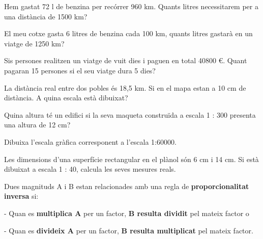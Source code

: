 \begin{mylist}
\exer
  Hem gastat 72 l de benzina per recórrer 960 km. Quants litres
  necessitarem per a una distància de 1500 km?
  
  
  
\exer
  El meu cotxe gasta 6 litres de benzina cada 100 km, quants litres
  gastarà en un viatge de 1250 km?


\exer
  Sis persones realitzen un viatge de vuit dies i paguen en total 40800
  \euro{}. Quant pagaran 15 persones si el seu viatge dura 5 dies?


\exer
  La distància real entre dos pobles és 18,5 km. Si en el mapa estan a
  10 cm de distància. A quina escala està dibuixat?


\exer
  Quina altura té un edifici si la seva maqueta construïda a escala 1 :
  300 presenta una altura de 12 cm?



\exer
  Dibuixa l'escala gràfica corresponent a l'escala 1:60000.


\exer
  Les dimensions d'una superfície rectangular en el plànol són 6 cm i 14
  cm. Si està dibuixat a escala 1 : 40, calcula les seves mesures reals.



\end{mylist}

\begin{theorybox}
  Dues magnituds A i B estan relacionades amb una regla de
  \textbf{proporcionalitat inversa} si:

  - Quan es \textbf{multiplica A} per un factor, \textbf{B resulta
  dividit} pel mateix factor o

  - Quan es \textbf{divideix A} per un factor, \textbf{B resulta
  multiplicat} pel mateix factor.
\end{theorybox}

